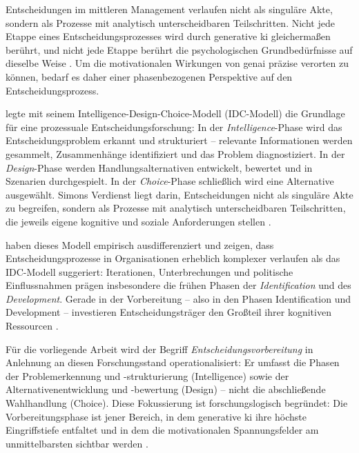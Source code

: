 Entscheidungen im mittleren Management verlaufen nicht als singuläre Akte, sondern als Prozesse mit analytisch unterscheidbaren Teilschritten. Nicht jede Etappe eines Entscheidungsprozesses wird durch generative \gls{ki} gleichermaßen berührt, und nicht jede Etappe berührt die psychologischen Grundbedürfnisse auf dieselbe Weise \parencite[vgl.][]{hermannGenAIPsychologyWork2025, IssuesTrendsGenerative}. Um die motivationalen Wirkungen von \gls{genai} präzise verorten zu können, bedarf es daher einer phasenbezogenen Perspektive auf den Entscheidungsprozess.

\textcite{simonNewScienceManagement1977} legte mit seinem Intelligence-Design-Choice-Modell (IDC-Modell) die Grundlage für eine prozessuale Entscheidungsforschung: In der \textit{Intelligence}-Phase wird das Entscheidungsproblem erkannt und strukturiert -- relevante Informationen werden gesammelt, Zusammenhänge identifiziert und das Problem diagnostiziert. In der \textit{Design}-Phase werden Handlungsalternativen entwickelt, bewertet und in Szenarien durchgespielt. In der \textit{Choice}-Phase schließlich wird eine Alternative ausgewählt. Simons Verdienst liegt darin, Entscheidungen nicht als singuläre Akte zu begreifen, sondern als Prozesse mit analytisch unterscheidbaren Teilschritten, die jeweils eigene kognitive und soziale Anforderungen stellen \parencite[vgl.][]{pomerolLegacyHerbertSimon2006}.

\textcite{mintzbergStructureUnstructuredDecision1976} haben dieses Modell empirisch ausdifferenziert und zeigen, dass Entscheidungsprozesse in Organisationen erheblich komplexer verlaufen als das IDC-Modell suggeriert: Iterationen, Unterbrechungen und politische Einflussnahmen prägen insbesondere die frühen Phasen der \textit{Identification} und des \textit{Development}. Gerade in der Vorbereitung -- also in den Phasen Identification und Development -- investieren Entscheidungsträger den Großteil ihrer kognitiven Ressourcen \parencite[vgl.][S.\,252--258]{mintzbergStructureUnstructuredDecision1976, langleyOpeningDecisionMaking1995}.

Für die vorliegende Arbeit wird der Begriff \textit{Entscheidungsvorbereitung} in Anlehnung an diesen Forschungsstand operationalisiert: Er umfasst die Phasen der Problemerkennung und -strukturierung (Intelligence) sowie der Alternativenentwicklung und -bewertung (Design) -- nicht die abschließende Wahlhandlung (Choice). Diese Fokussierung ist forschungslogisch begründet: Die Vorbereitungsphase ist jener Bereich, in dem generative \gls{ki} ihre höchste Eingriffstiefe entfaltet und in dem die motivationalen Spannungsfelder am unmittelbarsten sichtbar werden \parencite[vgl.][]{IssuesTrendsGenerative, doshiGenerativeArtificialIntelligence2025, hermannGenAIPsychologyWork2025}.

